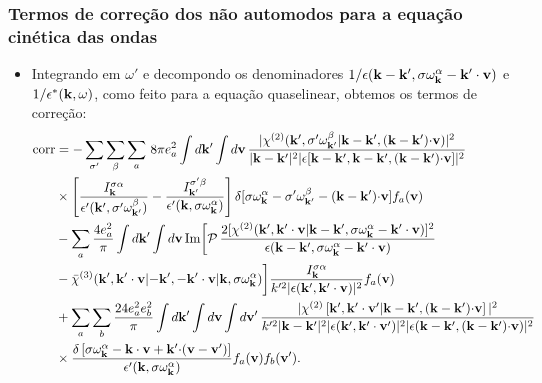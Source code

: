 \documentclass[10pt,aspectratio=1610,lualatex]{beamer}
\begin{document}
\begin{frame}
  \frametitle{Termos de correção dos não automodos para a equação
    cinética das ondas}
  \begin{itemize}
    \item Integrando em $\omega '$ e decompondo os denominadores
    $1/\epsilon({\bf k-k'},\sigma \omega_{\bf k}^\alpha-{\bf k'\cdot v})$
    e $1/\epsilon^*({\bf k},\omega)$, como feito para a equação quaselinear,
    obtemos os termos de correção: %
    \begin{equation*}
      \label{corr}
      \begin{split}
	\mbox{corr}&=-\sum_{\sigma '}\sum_\beta\sum_a \,8\pi e_a^2
	\int d{\bf k'}\int d{\bf v}\,
	\frac{|\chi^{(2)}({\bf k'},\sigma '\omega_{\bf k'}^\beta
	  |{\bf k-k'},({\bf k-k'}){\bf \cdot v})|^2}
	{|{\bf k-k'}|^2|\epsilon[{\bf k-k'},{\bf k-k'},
	  ({\bf k-k'}){\bf \cdot v}]|^2}\\
	&\times \left[ \frac{I_{\bf k}^{\sigma \alpha}}
	  {\epsilon '({\bf k'},\sigma '\omega_{\bf k'}^\beta)}
	  -\frac{I_{\bf k'}^{\sigma '\beta}}
	  {\epsilon '({\bf k},\sigma \omega_{\bf k}^\alpha)}\right]
	\delta[\sigma\omega_{\bf k}^\alpha-\sigma '\omega_{\bf k'}^\beta
	-({\bf k-k'}){\bf \cdot v}]f_a({\bf v})\\
	&-\sum_a \frac{4 e_a^2}{\pi}
	\int d{\bf k '}\int d{\bf v}\,\mbox{Im}\biggl[ \mathcal{P}\,
	\frac{2[\chi^{(2)}({\bf k'},{\bf k' \cdot v}|{\bf k-k'},
	  \sigma\omega_{\bf k}^\alpha-{\bf k'\cdot v})]^2}
	{\epsilon({\bf k-k'},\sigma \omega_{\bf k}^\alpha
	  -{\bf k'\cdot v})}\\
	&-\bar \chi^{(3)}({\bf k'},{\bf k' \cdot v}|{\bf -k'},
	{\bf -k'\cdot v}|{\bf k},\sigma\omega_{\bf k}^\alpha)\biggr]
	\frac{I_{\bf k}^{\sigma \alpha}}{k'^2|\epsilon({\bf k'},
	  {\bf k'\cdot v})|^2}f_a({\bf v})\\
	&+\sum_a\sum_b \frac{24 e_a^2 e_b^2}{\pi}\int d{\bf k '}
	\int d{\bf v} \int d{\bf v'}\,
	\frac{|\chi^{(2)} \left[ {\bf k'},{\bf k' \cdot v'}|
	    {\bf k-k'},({\bf k-k'}){\bf \cdot v} \right]|^2}
	{k'^2|{\bf k-k'}|^2|\epsilon({\bf k'},{\bf k'\cdot v'})|^2
	  |\epsilon({\bf k-k'},({\bf k-k'}){\bf \cdot v})|^2}\\
	&\times \frac{\delta \left[ \sigma\omega_{\bf k}^\alpha
	    -{\bf k \cdot v}+{\bf k' \cdot}({\bf v-v'})\right]}
	{\epsilon '({\bf k},\sigma\omega_{\bf k}^\alpha)}
	f_a({\bf v}) f_b({\bf v'}).
      \end{split}
    \end{equation*}
  \end{itemize}
\end{frame}
\end{document}
